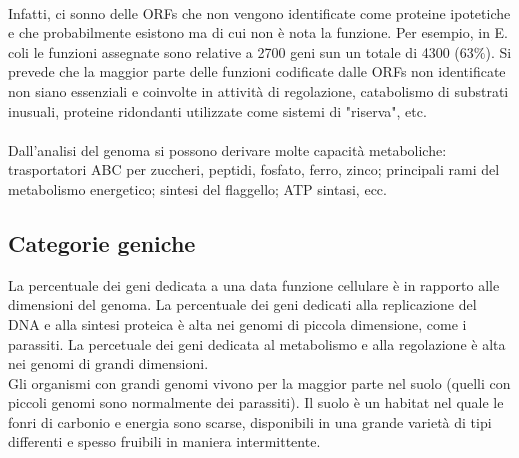 \\Infatti, ci sonno delle ORFs che non vengono identificate come proteine ipotetiche e che probabilmente esistono ma di cui non \`e nota la funzione. Per esempio, in E. coli le funzioni assegnate sono relative a 2700 geni sun un totale di 4300 (63$\%$). Si prevede che la maggior parte delle funzioni codificate dalle ORFs non identificate non siano essenziali e coinvolte in attivit\`a di regolazione, catabolismo di substrati inusuali, proteine ridondanti utilizzate come sistemi di "riserva", etc.
\\\\Dall'analisi del genoma si possono derivare molte capacit\`a metaboliche: trasportatori ABC per zuccheri, peptidi, fosfato, ferro, zinco; principali rami del metabolismo energetico; sintesi del flaggello; ATP sintasi, ecc. 
\\\subsection{Categorie geniche}
La percentuale dei geni dedicata a una data funzione cellulare \`e in rapporto alle dimensioni del genoma. La percentuale dei geni dedicati alla replicazione del DNA e alla sintesi proteica \`e alta nei genomi di piccola dimensione, come i parassiti. La percetuale dei geni dedicata al metabolismo e alla regolazione \`e alta nei genomi di grandi dimensioni.  
\\Gli organismi con grandi genomi vivono per la maggior parte nel suolo (quelli con piccoli genomi sono normalmente dei parassiti). Il suolo \`e un habitat nel quale le fonri di carbonio e energia sono scarse, disponibili in una grande variet\`a di tipi differenti e spesso fruibili in maniera intermittente. 
